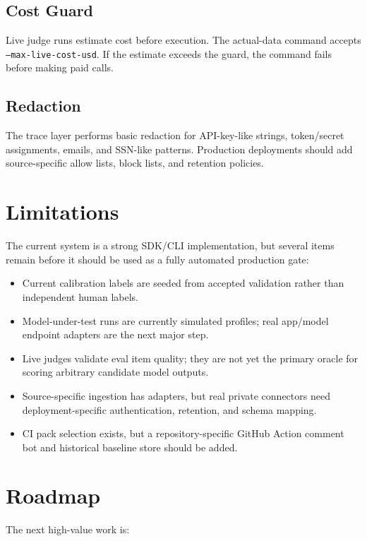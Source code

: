 \documentclass[11pt]{article}
\newcommand{\code}[1]{\texttt{#1}}
\begin{document}
\subsection{Cost Guard}

Live judge runs estimate cost before execution. The actual-data command accepts \code{--max-live-cost-usd}. If the estimate exceeds the guard, the command fails before making paid calls.

\subsection{Redaction}

The trace layer performs basic redaction for API-key-like strings, token/secret assignments, emails, and SSN-like patterns. Production deployments should add source-specific allow lists, block lists, and retention policies.

\section{Limitations}

The current system is a strong SDK/CLI implementation, but several items remain before it should be used as a fully automated production gate:

\begin{itemize}
  \item Current calibration labels are seeded from accepted validation rather than independent human labels.
  \item Model-under-test runs are currently simulated profiles; real app/model endpoint adapters are the next major step.
  \item Live judges validate eval item quality; they are not yet the primary oracle for scoring arbitrary candidate model outputs.
  \item Source-specific ingestion has adapters, but real private connectors need deployment-specific authentication, retention, and schema mapping.
  \item CI pack selection exists, but a repository-specific GitHub Action comment bot and historical baseline store should be added.
\end{itemize}

\section{Roadmap}

The next high-value work is:
\end{document}
